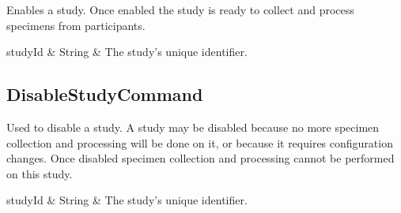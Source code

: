 Enables a study. Once enabled the study is ready to collect and process
specimens from participants.

\begin{commandparmtable}

  studyId & String & The study's unique identifier.\\

\end{commandparmtable}

\subsection*{DisableStudyCommand}

Used to disable a study. A study may be disabled because no more specimen
collection and processing will be done on it, or because it requires
configuration changes. Once disabled specimen collection and processing cannot
be performed on this study.

\begin{commandparmtable}

  studyId & String & The study's unique identifier.\\

\end{commandparmtable}






